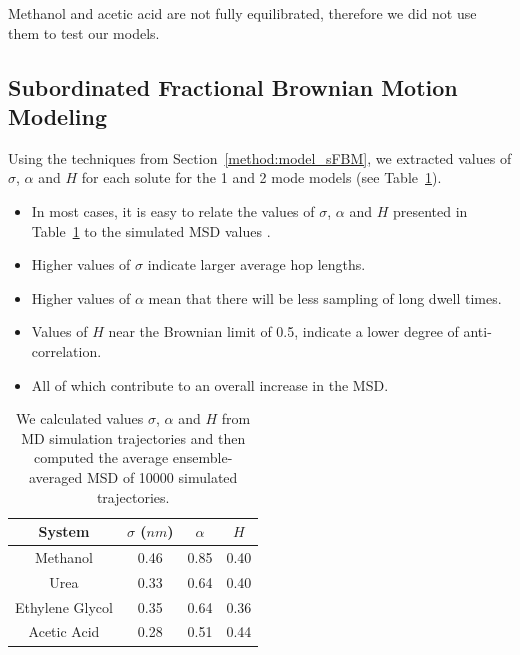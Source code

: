 \documentclass{article}
\begin{document}
  Methanol and acetic acid are not fully equilibrated, therefore we did not use them
  to test our models.

  \subsection{Subordinated Fractional Brownian Motion Modeling}\label{section:sFBM}
  
  Using the techniques from Section~\ref{method:model_sFBM}, we extracted values 
  of $\sigma$, $\alpha$ and $H$ for each solute for the 1 and 2 mode models 
  (see Table~\ref{table:sfbm_params}).
  \begin{itemize}
    \item In most cases, it is easy to relate the values of $\sigma$, $\alpha$ 
    and $H$ presented in Table~\ref{table:sfbm_params} to the simulated MSD values . 
  	\item Higher values of $\sigma$ indicate larger average hop lengths.
  	\item Higher values of $\alpha$ mean that there will be less sampling of 
  	long dwell times.
  	\item Values of $H$ near the Brownian limit of 0.5, indicate a lower degree
  	of anti-correlation.
  	\item All of which contribute to an overall increase in the MSD.
  \end{itemize}
  
  \begin{table}[h]
  \centering
  \begin{tabular}{cccc}
  \toprule
  System & $\sigma$ ($nm$) & $\alpha$ & $H$ \\
  \midrule
  Methanol & 0.46 & 0.85 & 0.40 \\
  Urea & 0.33 & 0.64 & 0.40 \\
  Ethylene Glycol & 0.35 & 0.64 & 0.36 \\
  Acetic Acid & 0.28 & 0.51 & 0.44 \\
  \bottomrule
  \end{tabular}
  \caption{We calculated values $\sigma$, $\alpha$ and $H$ from MD simulation
  trajectories and then computed the average ensemble-averaged MSD of 10000 
  simulated trajectories.}\label{table:sfbm_params}
  \end{table}
\end{document}
